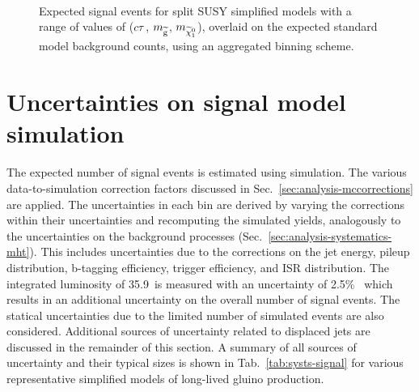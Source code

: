\begin{figure}[!ht]
~~
\\
\caption{Expected signal events for split SUSY simplified models with a range 
of values of ($c\tau$, $m_{\mathrm{\widetilde{g}}}$, $m_{\widetilde{\chi}_1^0}$), overlaid on the expected standard 
model background counts, using an aggregated binning scheme.}
\label{fig:T1qqqqLL_MR}
\end{figure}


\section{Uncertainties on signal model simulation}
The expected number of signal events is estimated using simulation. The various 
data-to-simulation correction factors discussed in 
Sec.~\ref{sec:analysis-mccorrections} are applied. The uncertainties in each 
\njnbhtmht bin are derived by varying the corrections within their 
uncertainties and recomputing the simulated yields, analogously to the 
uncertainties on the background processes 
(Sec.~\ref{sec:analysis-systematics-mht}). 
This includes uncertainties due to the corrections on the jet energy, pileup 
distribution, b-tagging efficiency, trigger efficiency, and ISR distribution. 
The integrated luminosity of 35.9~\ifb is measured with an uncertainty of 
2.5\%~\cite{lumi2016} which results in an additional uncertainty on the overall 
number of signal events. The statical uncertainties due to the limited number 
of simulated events are also considered. Additional sources of uncertainty 
related to displaced jets are discussed in the remainder of this section. A 
summary of all sources of uncertainty and their typical sizes is shown in 
Tab.~\ref{tab:systs-signal} for various representative simplified models of 
long-lived gluino production.

